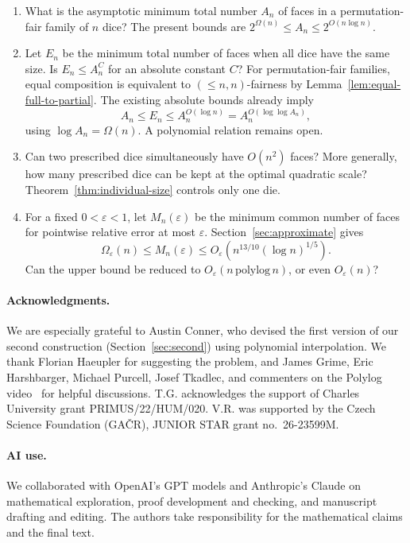 \documentclass[11pt]{article}
\theoremstyle{definition}
\theoremstyle{remark}
\begin{document}
\begin{enumerate}[leftmargin=*,itemsep=0.5em]
  \item What is the asymptotic minimum total number \(A_n\) of faces in a
        permutation-fair family of \(n\) dice? The present bounds are
        \(2^{\Omega(n)}\le A_n\le2^{O(n\log n)}\).
  \item Let \(E_n\) be the minimum total number of faces when all dice
        have the same size. Is \(E_n\le A_n^C\) for an absolute constant
        \(C\)? For permutation-fair families, equal composition is
        equivalent to \((\leq n,n)\)-fairness by
        Lemma~\ref{lem:equal-full-to-partial}.
        The existing absolute bounds already imply
        \[
          A_n\le E_n\le A_n^{O(\log n)}
                     =A_n^{O(\log\log A_n)},
        \]
        using \(\log A_n=\Omega(n)\). A polynomial relation remains open.
  \item Can two prescribed dice simultaneously have \(O(n^2)\) faces?
        More generally, how many prescribed dice can be kept at the
        optimal quadratic scale? Theorem~\ref{thm:individual-size}
        controls only one die.
  \item For a fixed \(0<\varepsilon<1\), let \(M_n(\varepsilon)\) be the
        minimum common number of faces for pointwise relative error at
        most \(\varepsilon\). Section~\ref{sec:approximate} gives
        \[
          \Omega_\varepsilon(n)\le M_n(\varepsilon)
          \le O_\varepsilon\!\left(n^{13/10}(\log n)^{1/5}\right).
        \]
        Can the upper bound be reduced to
        \(O_\varepsilon(n\,\mathrm{polylog}\,n)\), or even
        \(O_\varepsilon(n)\)?
\end{enumerate}

\paragraph{Acknowledgments.}
We are especially grateful to Austin Conner, who devised the first version
of our second construction (Section~\ref{sec:second}) using polynomial
interpolation.
We thank Florian Haeupler for suggesting the problem, and James Grime,
Eric Harshbarger, Michael Purcell, Josef Tkadlec, and commenters on the
Polylog video~\cite{polylog-video} for helpful discussions.  T.G. acknowledges
the support of Charles University grant PRIMUS/22/HUM/020.
V.R. was supported by the Czech Science Foundation (GA\v{C}R), JUNIOR STAR
grant no.~26-23599M.

\paragraph{AI use.}
We collaborated with OpenAI's GPT models and Anthropic's Claude on mathematical
exploration, proof development and checking, and manuscript drafting and editing.
The authors take responsibility for the mathematical claims and the final
text.

\clearpage
\appendix


\begingroup
\sloppy


\endgroup
\end{document}
